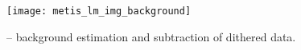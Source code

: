 \begin{figure}[hb]
  \centering
  \texttt{[image: metis\_lm\_img\_background]}
  \caption[Recipe: ]{ --
    background estimation and subtraction of dithered  data.}
  \label{fig:metis_lm_img_background}
\end{figure}


\clearpage

%
%
%
%
%
